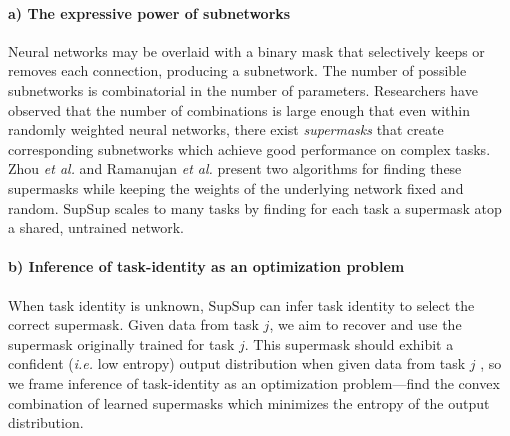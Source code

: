 \documentclass{article}
\newcommand{\ac}{SupSup\xspace}
\begin{document}
\paragraph{a) The expressive power of subnetworks}
Neural networks may be overlaid with a binary mask that selectively keeps or removes each connection, producing a subnetwork.
The number of possible subnetworks is combinatorial in the number of parameters. Researchers have observed that the number of combinations is large enough 
that even within randomly weighted neural networks, there exist \emph{supermasks} that create corresponding subnetworks which achieve good performance on complex tasks. Zhou \textit{et al.} \cite{zhou2019deconstructing} and Ramanujan \textit{et al.} \cite{ramanujan2019s} present two algorithms for finding these supermasks while keeping the weights of the underlying network fixed and random.
SupSup scales to many tasks by finding for each task a supermask atop a shared, untrained network.

\paragraph{b) Inference of task-identity as an optimization problem}
When task identity is unknown, $\text{\ac}$ can infer task identity to select the correct supermask.
Given data from task $j$, we aim to recover and use the supermask originally trained for task $j$. This supermask should exhibit a confident (\textit{i.e.} low entropy) output distribution when given data from task $j$ \cite{hendrycks2016baseline}, so we frame inference of task-identity as an optimization problem---find the convex combination of learned supermasks which minimizes the entropy of the output distribution.
\end{document}
